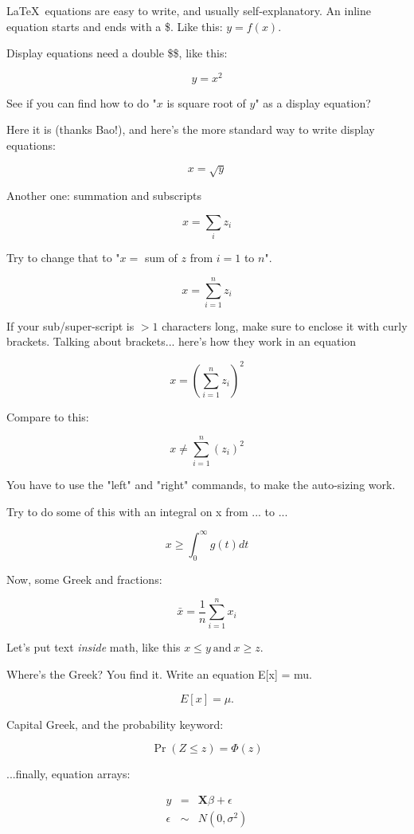 \documentclass{article}
\begin{document}
\LaTeX \ equations are easy to write, and usually self-explanatory. An inline equation starts and ends with a \$. Like this: $y=f(x)$.

Display equations need a double \$\$, like this:

$$ y=x^2 $$

See if you can find how to do "$x$ is square root of $y$" as a display equation?

Here it is (thanks Bao!), and here's the more standard way to write display equations:

\begin{equation}
x = \sqrt{y}
\end{equation}

Another one:  summation and subscripts

\begin{equation}
x = \sum_i z_i
\end{equation}

Try to change that to "$x=$ sum of $z$ from $i=1$ to $n$".

\begin{equation}
x = \sum_{i=1}^n z_i
\end{equation}

If your sub/super-script is $>1$ characters long, make sure to enclose it with curly brackets.  Talking about brackets... here's how they work in an equation

\begin{equation}
x = \left(\sum_{i=1}^n z_i\right)^2
\end{equation}

Compare to this:

\begin{equation}
x \neq \sum_{i=1}^n \left(z_i\right)^2
\end{equation}

You have to use the "left" and "right" commands, to make the auto-sizing work.

Try to do some of this with an integral on x from ... to ...

$$ x \geq \int_{0}^{\infty} g(t)dt $$

Now, some Greek and fractions:

\begin{equation}
\bar{x} = \frac{1}{n}\sum_{i=1}^n x_i
\end{equation}

Let's put text \emph{inside} math, like this $x\leq y\mathrm{\ and \ } x \geq z$.

Where's the Greek? You find it. Write an equation E[x] = mu.

$$ E[x] = \mu.$$

Capital Greek, and the probability keyword:

$$ \Pr\left(Z\leq z\right) = \Phi(z) $$

...finally, equation arrays:

\begin{equation}
\begin{array}{rcl}
	y & = & \mathbf{X}\beta+\epsilon \\
	\epsilon & \sim & N\left(0,\sigma^2\right)
\end{array}
\end{equation}
\end{document}
